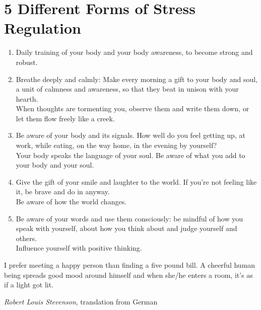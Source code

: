 \documentclass[../Book.Stress_regulation.tex]{subfiles}
\begin{document}
\section{5 Different Forms of Stress Regulation}
\begin{enumerate} 
\item  Daily {training of your body} and your body awareness, to become {strong and robust}.
\item {Breathe deeply} and calmly: Make every morning a gift to your body and soul, a unit of calmness and awareness, so that they beat in unison with your hearth.\\
When {thoughts} are tormenting you, observe them and write them down, or let them flow freely like a creek.
\item {Be aware} of your body and its signals. How well do you feel getting up, at work, while eating, on the way home, in the evening by yourself?\\
Your body speaks the {language of your soul}. Be aware of what you add to your body and your soul.
\item Give the {gift of your smile} and laughter to the world. If you're not feeling like it, be brave and do in anyway.\\
Be aware of how the world changes.
\item Be aware of your {words} and use them consciously: be mindful of how you speak with yourself, about how you think about and judge yourself and others.\\
Influence yourself with {positive thinking}. 
\end{enumerate}




\epigraph{I prefer meeting a happy person than finding a five pound bill. A cheerful human being spreads good mood around himself and when she/he enters a room, it's as if a light got lit.}{\textit{Robert Louis Stevenson}, translation from German}
\end{document}
